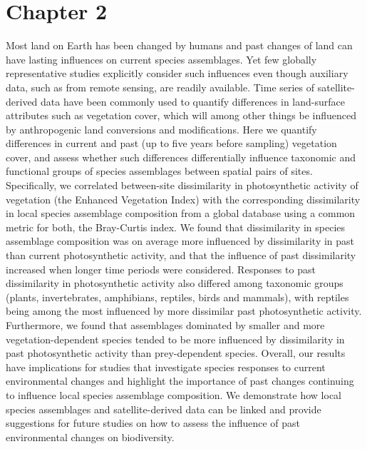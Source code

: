 \chapter{Chapter 2}


Most land on Earth has been changed by humans and past changes of land can have lasting influences on current species assemblages. Yet few globally representative studies explicitly consider such influences even though auxiliary data, such as from remote sensing, are readily available. Time series of satellite-derived data have been commonly used to quantify differences in land-surface attributes such as vegetation cover, which will among other things be influenced by anthropogenic land conversions and modifications. Here we quantify differences in current and past (up to five years before sampling) vegetation cover, and assess whether such differences differentially influence taxonomic and functional groups of species assemblages between spatial pairs of sites. Specifically, we correlated between-site dissimilarity in photosynthetic activity of vegetation (the Enhanced Vegetation Index) with the corresponding dissimilarity in local species assemblage composition from a global database using a common metric for both, the Bray-Curtis index. We found that dissimilarity in species assemblage composition was on average more influenced by dissimilarity in past than current photosynthetic activity, and that the influence of past dissimilarity increased when longer time periods were considered. Responses to past dissimilarity in photosynthetic activity also differed among taxonomic groups (plants, invertebrates, amphibians, reptiles, birds and mammals), with reptiles being among the most influenced by more dissimilar past photosynthetic activity. Furthermore, we found that assemblages dominated by smaller and more vegetation-dependent species tended to be more influenced by dissimilarity in past photosynthetic activity than prey-dependent species. Overall, our results have implications for studies that investigate species responses to current environmental changes and highlight the importance of past changes continuing to influence local species assemblage composition. We demonstrate how local species assemblages and satellite-derived data can be linked and provide suggestions for future studies on how to assess the influence of past environmental changes on biodiversity.

